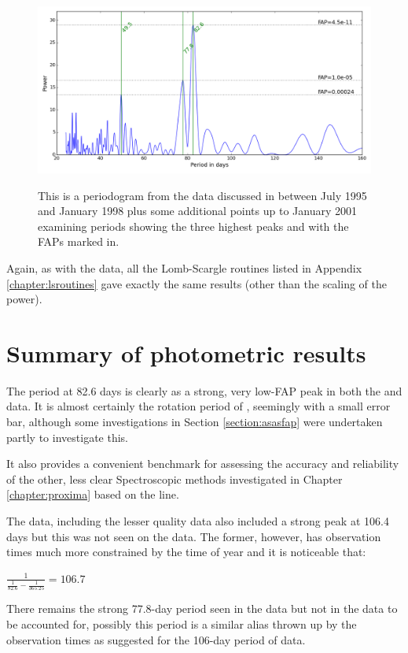 \begin{figure}[!htbp]
\begin{center}
\includegraphics[scale=0.50]{Figures/hstb4min.png} \\
\end{center}
\caption{This is a periodogram from the {\hst} data discussed in \citet{benedict98} between July 1995 and January 1998 plus some additional
  points up to January 2001 examining periods showing the three highest peaks and with the FAPs marked in.}
\protect\label{fig:hstb4min}
\end{figure}

Again, as with the {\asas} data, all the Lomb-Scargle routines listed in Appendix \ref{chapter:lsroutines} gave exactly
the same results (other than the scaling of the power).

\section{Summary of photometric results}
\protect\label{section:summphotometric}

The period at 82.6 days is clearly as a strong, very low-FAP peak in both the {\asas} and {\hst} data. It is almost
certainly the rotation period of {\prox}, seemingly with a small error bar, although some investigations in Section
\ref{section:asasfap} were undertaken partly to investigate this.

It also provides a convenient benchmark for assessing the accuracy and reliability of the other, less clear
Spectroscopic methods investigated in Chapter \ref{chapter:proxima} based on the {\ha} line.

The {\asas} data, including the lesser quality data also included a strong peak at 106.4 days but this was not seen on
the {\hst} data. The former, however, has observation times much more constrained by the time of year and it is
noticeable that:

\begin{center}

$ \frac{1}{\frac{1}{82.6} - \frac{1}{365.25}} = 106.7 $

\end{center}

There remains the strong 77.8-day period seen in the {\hst} data but not in the {\asas} data to be accounted for,
possibly this period is a similar alias thrown up by the observation times as suggested for the 106-day period of
{\asas} data.


